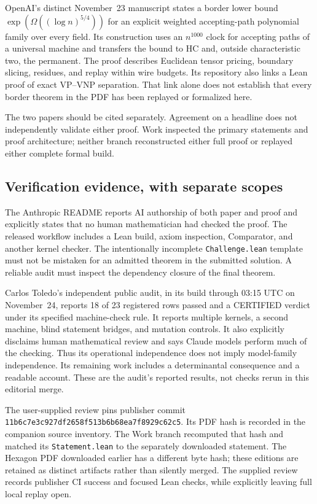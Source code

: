 \documentclass[11pt,letterpaper]{article}
\begin{document}
OpenAI's distinct November~23 manuscript states a border lower bound $\exp(\Omega((\log n)^{5/4}))$ for an explicit weighted accepting-path polynomial family over every field. Its construction uses an $n^{1000}$ clock for accepting paths of a universal machine and transfers the bound to HC and, outside characteristic two, the permanent. The proof describes Euclidean tensor pricing, boundary slicing, residues, and replay within wire budgets. Its repository also links a Lean proof of exact VP--VNP separation. That link alone does not establish that every border theorem in the PDF has been replayed or formalized here.\cite{openai}

The two papers should be cited separately. Agreement on a headline does not independently validate either proof. Work inspected the primary statements and proof architecture; neither branch reconstructed either full proof or replayed either complete formal build.

\subsection{Verification evidence, with separate scopes}
The Anthropic README reports AI authorship of both paper and proof and explicitly states that no human mathematician had checked the proof. The released workflow includes a Lean build, axiom inspection, Comparator, and another kernel checker. The intentionally incomplete \texttt{Challenge.lean} template must not be mistaken for an admitted theorem in the submitted solution. A reliable audit must inspect the dependency closure of the final theorem.\cite{anthropicrepo}

Carlos Toledo's independent public audit, in its build through 03:15 UTC on November~24, reports 18 of 23 registered rows passed and a CERTIFIED verdict under its specified machine-check rule. It reports multiple kernels, a second machine, blind statement bridges, and mutation controls. It also explicitly disclaims human mathematical review and says Claude models perform much of the checking. Thus its operational independence does not imply model-family independence. Its remaining work includes a determinantal consequence and a readable account. These are the audit's reported results, not checks rerun in this editorial merge.\cite{toledo}

The user-supplied review pins publisher commit
\texttt{11b6c7e3c927df2658f513b6b68ea7f8929c62c5}. Its PDF hash is recorded in the companion source inventory. The Work branch recomputed that hash and matched its \texttt{Statement.lean} to the separately downloaded statement. The Hexagon PDF downloaded earlier has a different byte hash; these editions are retained as distinct artifacts rather than silently merged. The supplied review records publisher CI success and focused Lean checks, while explicitly leaving full local replay open.\cite{internalvp}
\end{document}
